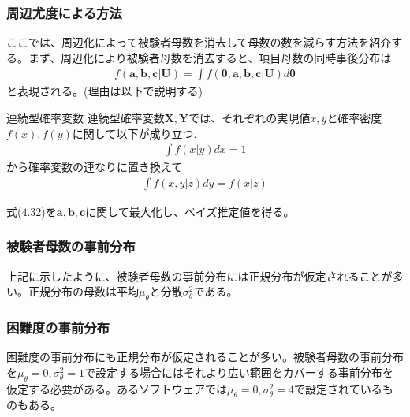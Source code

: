 \documentclass[12pt]{jarticle}
\begin{document}
\subsubsection{周辺尤度による方法}
ここでは、周辺化によって被験者母数を消去して母数の数を減らす方法を紹介する。まず、周辺化により被験者母数を消去すると、項目母数の同時事後分布は
\begin{align}
  \label{03}
  \displaystyle
  f(\boldsymbol{a,b,c}|\boldsymbol{U}) = \int f(\boldsymbol{\theta,a,b,c}|\boldsymbol{U}) d\boldsymbol{\theta} \tag{4.32}
\end{align}と表現される。(理由は以下で説明する)
\begin{itembox}[l]{連続型確率変数}
  連続型確率変数$\boldsymbol{X,Y}$では、それぞれの実現値$x,y$と確率密度$f(x),f(y)$に関して以下が成り立つ.
  \begin{align}
    \label{04}
    \displaystyle
    \int f(x|y)dx = 1
    \tag{4.33}
  \end{align}から確率変数の連なりに置き換えて
  \begin{align}
    \label{05}
    \displaystyle
    \int f(x,y|z)dy = f(x|z)
    \tag{4.34}
  \end{align}
\end{itembox}
式($4.32$)を$\boldsymbol{a,b,c}$に関して最大化し、ベイズ推定値を得る。
\subsubsection{被験者母数の事前分布}
上記に示したように、被験者母数の事前分布には正規分布が仮定されることが多い。正規分布の母数は平均$\mu_\theta$と分散${\sigma}^2 _\theta$である。
\subsubsection{困難度の事前分布}
困難度の事前分布にも正規分布が仮定されることが多い。被験者母数の事前分布を$\mu_\theta = 0,{\sigma}^2 _\theta = 1$で設定する場合にはそれより広い範囲をカバーする事前分布を仮定する必要がある。あるソフトウェアでは$\mu_\theta = 0,{\sigma}^2 _\theta = 4$で設定されているものもある。
\end{document}
